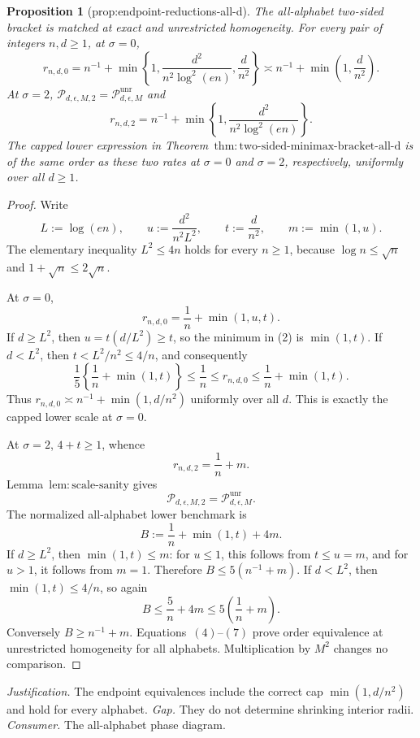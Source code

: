 \documentclass{article}
\newtheorem{proposition}{Proposition}
\begin{document}
\begin{proposition}[prop:endpoint-reductions-all-d]\label{prop:endpoint-reductions-all-d}
The all-alphabet two-sided bracket is matched at exact and unrestricted homogeneity.  For every pair of integers \(n,d\ge1\), at \(\sigma=0\),
\[
 r_{n,d,0}=n^{-1}+\min\left\{1,\frac{d^2}{n^2\log^2(en)},\frac d{n^2}\right\}
 \asymp n^{-1}+\min\left(1,\frac d{n^2}\right).
\]
At \(\sigma=2\), \(\mathcal P_{d,\epsilon,M,2}=\mathcal P_{d,\epsilon,M}^{\mathrm{unr}}\) and
\[
 r_{n,d,2}=n^{-1}+\min\left\{1,\frac{d^2}{n^2\log^2(en)}\right\}.
\]
The capped lower expression in Theorem~\(\mathrm{thm:two\text{-}sided\text{-}minimax\text{-}bracket\text{-}all\text{-}d}\) is of the same order as these two rates at \(\sigma=0\) and \(\sigma=2\), respectively, uniformly over all \(d\ge1\).
\end{proposition}
\begin{proof}
Write
\[
 L:=\log(en),\qquad u:=\frac{d^2}{n^2L^2},
 \qquad t:=\frac d{n^2},\qquad m:=\min(1,u).
\tag{1}
\]
The elementary inequality \(L^2\le4n\) holds for every \(n\ge1\), because \(\log n\le\sqrt n\) and \(1+\sqrt n\le2\sqrt n\).

At \(\sigma=0\),
\[
 r_{n,d,0}=\frac1n+\min(1,u,t).
\tag{2}
\]
If \(d\ge L^2\), then \(u=t(d/L^2)\ge t\), so the minimum in (2) is \(\min(1,t)\).  If \(d<L^2\), then \(t<L^2/n^2\le4/n\), and consequently
\[
 \frac15\left\{\frac1n+\min(1,t)\right\}
 \le\frac1n\le r_{n,d,0}
 \le\frac1n+\min(1,t).
\tag{3}
\]
Thus \(r_{n,d,0}\asymp n^{-1}+\min(1,d/n^2)\) uniformly over all \(d\).  This is exactly the capped lower scale at \(\sigma=0\).

At \(\sigma=2\), \(4+t\ge1\), whence
\[
 r_{n,d,2}=\frac1n+m.
\tag{4}
\]
Lemma~\(\mathrm{lem:scale\text{-}sanity}\) gives
\[
 \mathcal P_{d,\epsilon,M,2}=\mathcal P_{d,\epsilon,M}^{\mathrm{unr}}.
\tag{5}
\]
The normalized all-alphabet lower benchmark is
\[
 B:=\frac1n+\min(1,t)+4m.
\tag{6}
\]
If \(d\ge L^2\), then \(\min(1,t)\le m\): for \(u\le1\), this follows from \(t\le u=m\), and for \(u>1\), it follows from \(m=1\).  Therefore \(B\le5(n^{-1}+m)\).  If \(d<L^2\), then \(\min(1,t)\le4/n\), so again
\[
 B\le\frac5n+4m\le5\left(\frac1n+m\right).
\tag{7}
\]
Conversely \(B\ge n^{-1}+m\).  Equations~\((4)\)--\((7)\) prove order equivalence at unrestricted homogeneity for all alphabets.  Multiplication by \(M^2\) changes no comparison.
\end{proof}
\par\smallskip\noindent \textit{Justification.} The endpoint equivalences include the correct cap \(\min(1,d/n^2)\) and hold for every alphabet. \textit{Gap.} They do not determine shrinking interior radii. \textit{Consumer.} The all-alphabet phase diagram.
\end{document}
